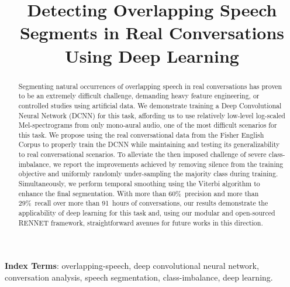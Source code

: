 \documentclass[a4paper]{article}
\title{
       Detecting Overlapping Speech Segments in Real Conversations\\
       Using Deep Learning
}
\begin{document}
\maketitle

\newcommand{\outline}[1]{}  %
\newcommand{\widom}[1]{}  %

\begin{abstract}
\widom{
       - the problem,
       - the approach and solutions
       - the main contributions of the paper.
       - little if any background and motivation. address the experts.
       - factual but comprehensive.
}
Segmenting natural occurrences of overlapping speech in real conversations has proven to be an extremely difficult challenge, demanding heavy feature engineering, or controlled studies using artificial data.
We demonstrate training a Deep Convolutional Neural Network (DCNN) for this task, affording us to use relatively low-level log-scaled Mel-spectrograms from only mono-aural audio, one of the most difficult scenarios for this task.
We propose using the real conversational data from the Fisher English Corpus to properly train the DCNN while maintaining and testing its generalizability to real conversational scenarios.
To alleviate the then imposed challenge of severe class-imbalance, we report the improvements achieved by removing silence from the training objective and uniformly randomly under-sampling the majority class during training.
Simultaneously, we perform temporal smoothing using the Viterbi algorithm to enhance the final segmentation.
With more than 60\%~precision and more than 29\%~recall over more than 91~hours of conversations, our results demonstrate the applicability of deep learning for this task and, using our modular and open-sourced RENNET framework,
straightforward avenues for future works in this direction.

\end{abstract}

\noindent\textbf{Index Terms}:
overlapping-speech,
deep convolutional neural network,
conversation analysis,
speech segmentation,
class-imbalance,
deep learning.

\end{document}
